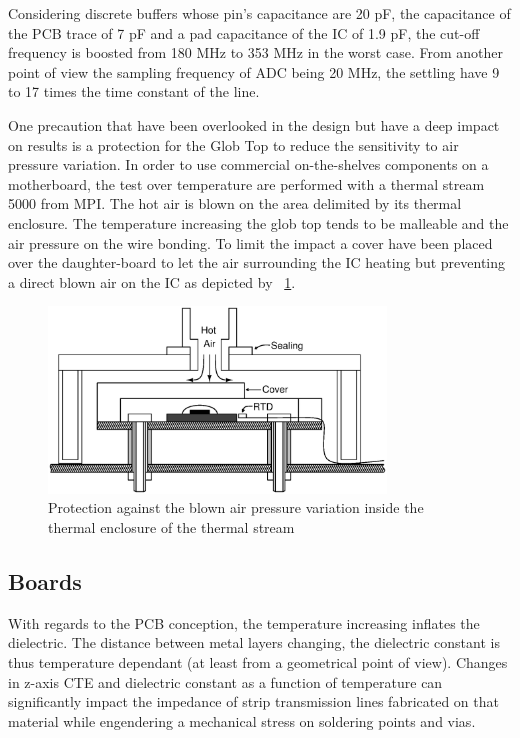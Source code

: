 Considering discrete buffers whose pin's capacitance are 20 pF, the capacitance of the PCB trace of 7 pF and a pad capacitance of the IC of 1.9 pF, the cut-off frequency is boosted from 180 MHz to 353 MHz in the worst case. From another point of view the sampling frequency of ADC being 20 MHz, the settling have 9 to 17 times the time constant of the line.

One precaution that have been overlooked in the design but have a deep impact on results is a protection for the Glob Top to reduce the sensitivity to air pressure variation. In order to use commercial on-the-shelves components on a motherboard, the test over temperature are performed with a thermal stream 5000 from MPI\@. The hot air is blown on the area delimited by its thermal enclosure. The temperature increasing the glob top tends to be malleable and the air pressure on the wire bonding. To limit the impact a cover have been placed over the daughter-board to let the air surrounding the IC heating but preventing a direct blown air on the IC as depicted by \figurename~\ref{fig:thermalstream-air-protection}.

\begin{figure}[htp]
    \centering
    \includegraphics[width=0.8\textwidth]{Chapter5/Figs/PCB/thermal-stream-protection.ps}
    \caption{Protection against the blown air pressure variation inside the thermal enclosure of the thermal stream}
    \label{fig:thermalstream-air-protection}
\end{figure}

\subsection{Boards}
With regards to the PCB conception, the temperature increasing inflates the dielectric. The distance between metal layers changing, the dielectric constant is thus temperature dependant (at least from a geometrical point of view). Changes in z-axis CTE and dielectric constant as a function of temperature can significantly impact the impedance of strip transmission lines fabricated on that material while engendering a mechanical stress on soldering points and vias.

